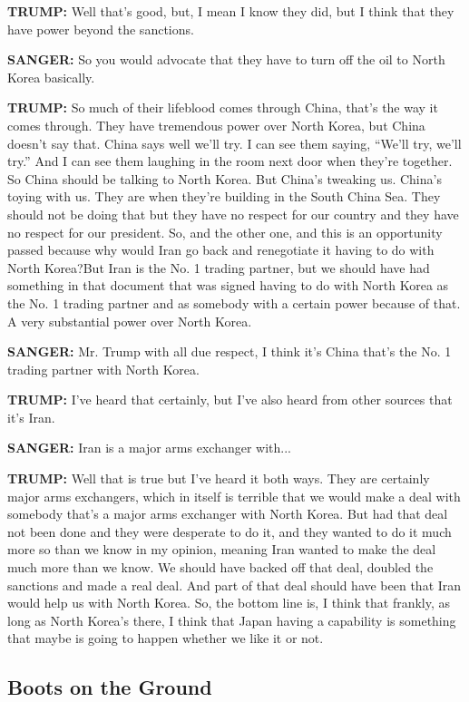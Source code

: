 \textbf{TRUMP:} Well that's good, but, I mean I know they did, but I
think that they have power beyond the sanctions.

\textbf{SANGER:} So you would advocate that they have to turn off the
oil to North Korea basically.

\textbf{TRUMP:} So much of their lifeblood comes through China, that's
the way it comes through. They have tremendous power over North Korea,
but China doesn't say that. China says well we'll try. I can see them
saying, ``We'll try, we'll try.'' And I can see them laughing in the
room next door when they're together. So China should be talking to
North Korea. But China's tweaking us. China's toying with us. They are
when they're building in the South China Sea. They should not be doing
that but they have no respect for our country and they have no respect
for our president. So, and the other one, and this is an opportunity
passed because why would Iran go back and renegotiate it having to do
with North Korea?But Iran is the No. 1 trading partner, but we should
have had something in that document that was signed having to do with
North Korea as the No. 1 trading partner and as somebody with a certain
power because of that. A very substantial power over North Korea.

\textbf{SANGER:} Mr. Trump with all due respect, I think it's China
that's the No. 1 trading partner with North Korea.

\textbf{TRUMP:} I've heard that certainly, but I've also heard from
other sources that it's Iran.

\textbf{SANGER:} Iran is a major arms exchanger with...

\textbf{TRUMP:} Well that is true but I've heard it both ways. They are
certainly major arms exchangers, which in itself is terrible that we
would make a deal with somebody that's a major arms exchanger with North
Korea. But had that deal not been done and they were desperate to do it,
and they wanted to do it much more so than we know in my opinion,
meaning Iran wanted to make the deal much more than we know. We should
have backed off that deal, doubled the sanctions and made a real deal.
And part of that deal should have been that Iran would help us with
North Korea. So, the bottom line is, I think that frankly, as long as
North Korea's there, I think that Japan having a capability is something
that maybe is going to happen whether we like it or not.

\hypertarget{boots-on-the-ground}{%
\subsection{Boots on the Ground}\label{boots-on-the-ground}}

